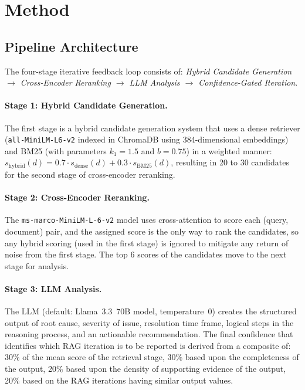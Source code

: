 \documentclass[11pt,a4paper]{article}
\begin{document}

\section{Method}
\label{sec:method}

\subsection{Pipeline Architecture}

The four-stage iterative feedback loop consists of:
\emph{Hybrid Candidate Generation $\to$ Cross-Encoder Reranking
$\to$ LLM Analysis $\to$ Confidence-Gated Iteration}.

\paragraph{Stage 1: Hybrid Candidate Generation.}
The first stage is a hybrid candidate generation system that uses a
dense retriever (\texttt{all-MiniLM-L6-v2} indexed in ChromaDB using
384-dimensional embeddings) and BM25 (with parameters $k_1{=}1.5$
and $b{=}0.75$) in a weighted manner:
$s_{\text{hybrid}}(d) = 0.7 \cdot s_{\text{dense}}(d) + 0.3 \cdot
s_{\text{BM25}}(d)$,
resulting in 20 to 30 candidates for the second stage of
cross-encoder reranking.

\paragraph{Stage 2: Cross-Encoder Reranking.}
The \texttt{ms-marco-MiniLM-L-6-v2} model uses cross-attention to
score each (query, document) pair, and the assigned score is the
only way to rank the candidates, so any hybrid scoring (used in the
first stage) is ignored to mitigate any return of noise from the
first stage.
The top 6 scores of the candidates move to the next stage for
analysis.

\paragraph{Stage 3: LLM Analysis.}
The LLM (default: Llama~3.3~70B model, temperature~0) creates the
structured output of root cause, severity of issue, resolution time
frame, logical steps in the reasoning process, and an actionable
recommendation.
The final confidence that identifies which RAG iteration is to be
reported is derived from a composite of: 30\% of the mean score of
the retrieval stage, 30\% based upon the completeness of the output,
20\% based upon the density of supporting evidence of the output,
20\% based on the RAG iterations having similar output values.
\end{document}
